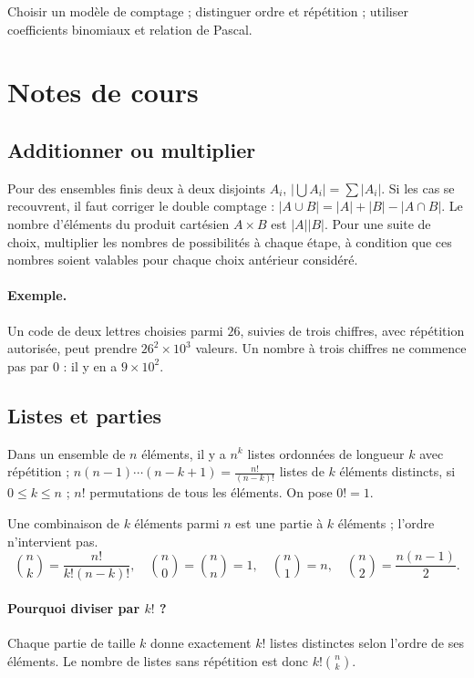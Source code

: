 \label{ch:9}


\begin{keypoint}[Objectifs]Choisir un modèle de comptage ; distinguer ordre et répétition ; utiliser coefficients binomiaux et relation de Pascal.\end{keypoint}

\section{Notes de cours}
\subsection{Additionner ou multiplier}
Pour des ensembles finis deux à deux disjoints $A_i$, $|\bigcup A_i|=\sum|A_i|$. Si les cas se recouvrent, il faut corriger le double comptage : $|A\cup B|=|A|+|B|-|A\cap B|$.
Le nombre d'éléments du produit cartésien $A\times B$ est $|A||B|$. Pour une suite de choix, multiplier les nombres de possibilités à chaque étape, à condition que ces nombres soient valables pour chaque choix antérieur considéré.
\paragraph{Exemple.} Un code de deux lettres choisies parmi $26$, suivies de trois chiffres, avec répétition autorisée, peut prendre $26^2\times10^3$ valeurs. Un nombre à trois chiffres ne commence pas par $0$ : il y en a $9\times10^2$.
\subsection{Listes et parties}
Dans un ensemble de $n$ éléments, il y a $n^k$ listes ordonnées de longueur $k$ avec répétition ; $n(n-1)\cdots(n-k+1)=\frac{n!}{(n-k)!}$ listes de $k$ éléments distincts, si $0\le k\le n$ ; $n!$ permutations de tous les éléments. On pose $0!=1$.
\begin{keypoint}[Combinaisons]
Une combinaison de $k$ éléments parmi $n$ est une partie à $k$ éléments ; l'ordre n'intervient pas.
\[\binom nk=\frac{n!}{k!(n-k)!},\quad\binom n0=\binom nn=1,\quad\binom n1=n,\quad\binom n2=\frac{n(n-1)}2.\]
\end{keypoint}
\paragraph{Pourquoi diviser par $k!$ ?} Chaque partie de taille $k$ donne exactement $k!$ listes distinctes selon l'ordre de ses éléments. Le nombre de listes sans répétition est donc $k!\binom nk$.
